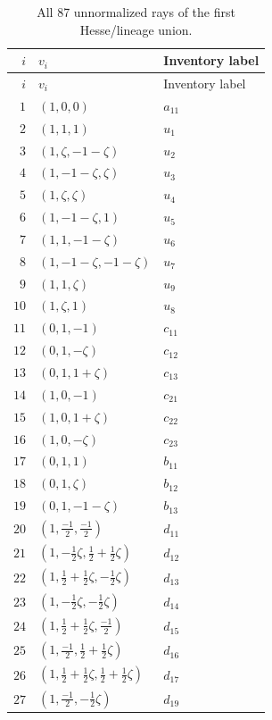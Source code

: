 \documentclass[aps,pra,reprint,superscriptaddress,longbibliography,nofootinbib,floatfix,10pt]{revtex4-2}
\theoremstyle{definition}
\begin{document}
\begin{longtable}{rll}
\caption{All 87 unnormalized rays of the first Hesse/lineage union.}\label{tab:hesse87-vectors}\\
\toprule
$i$ & $v_i$ & Inventory label\\\midrule
\endfirsthead
\toprule
$i$ & $v_i$ & Inventory label\\\midrule
\endhead
\bottomrule\endfoot
$1$ & $(1,0,0)$ & $a_{11}$\\
$2$ & $(1,1,1)$ & $u_{1}$\\
$3$ & $(1,\zeta,-1-\zeta)$ & $u_{2}$\\
$4$ & $(1,-1-\zeta,\zeta)$ & $u_{3}$\\
$5$ & $(1,\zeta,\zeta)$ & $u_{4}$\\
$6$ & $(1,-1-\zeta,1)$ & $u_{5}$\\
$7$ & $(1,1,-1-\zeta)$ & $u_{6}$\\
$8$ & $(1,-1-\zeta,-1-\zeta)$ & $u_{7}$\\
$9$ & $(1,1,\zeta)$ & $u_{9}$\\
$10$ & $(1,\zeta,1)$ & $u_{8}$\\
$11$ & $(0,1,-1)$ & $c_{11}$\\
$12$ & $(0,1,-\zeta)$ & $c_{12}$\\
$13$ & $(0,1,1+\zeta)$ & $c_{13}$\\
$14$ & $(1,0,-1)$ & $c_{21}$\\
$15$ & $(1,0,1+\zeta)$ & $c_{22}$\\
$16$ & $(1,0,-\zeta)$ & $c_{23}$\\
$17$ & $(0,1,1)$ & $b_{11}$\\
$18$ & $(0,1,\zeta)$ & $b_{12}$\\
$19$ & $(0,1,-1-\zeta)$ & $b_{13}$\\
$20$ & $(1,\frac{-1}{2},\frac{-1}{2})$ & $d_{11}$\\
$21$ & $(1,-\frac{1}{2}\zeta,\frac{1}{2}+\frac{1}{2}\zeta)$ & $d_{12}$\\
$22$ & $(1,\frac{1}{2}+\frac{1}{2}\zeta,-\frac{1}{2}\zeta)$ & $d_{13}$\\
$23$ & $(1,-\frac{1}{2}\zeta,-\frac{1}{2}\zeta)$ & $d_{14}$\\
$24$ & $(1,\frac{1}{2}+\frac{1}{2}\zeta,\frac{-1}{2})$ & $d_{15}$\\
$25$ & $(1,\frac{-1}{2},\frac{1}{2}+\frac{1}{2}\zeta)$ & $d_{16}$\\
$26$ & $(1,\frac{1}{2}+\frac{1}{2}\zeta,\frac{1}{2}+\frac{1}{2}\zeta)$ & $d_{17}$\\
$27$ & $(1,\frac{-1}{2},-\frac{1}{2}\zeta)$ & $d_{19}$\\

\end{longtable}
\end{document}
